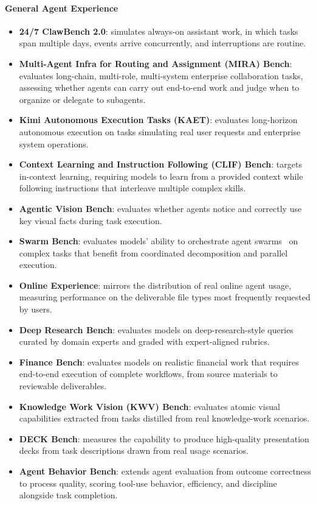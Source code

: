 \paragraph{General Agent Experience}
\begin{itemize}[leftmargin=12pt]
  \item \textbf{24/7 ClawBench 2.0}: simulates always-on assistant work, in which tasks span multiple days, events arrive concurrently, and interruptions are routine.
  \item \textbf{Multi-Agent Infra for Routing and Assignment (MIRA) Bench}: evaluates long-chain, multi-role, multi-system enterprise collaboration tasks, assessing whether agents can carry out end-to-end work and judge when to organize or delegate to subagents.
  \item \textbf{Kimi Autonomous Execution Tasks (KAET)}: evaluates long-horizon autonomous execution on tasks simulating real user requests and enterprise system operations.
  \item \textbf{Context Learning and Instruction Following (CLIF) Bench}: targets in-context learning, requiring models to learn from a provided context while following instructions that interleave multiple complex skills.
  \item \textbf{Agentic Vision Bench}: evaluates whether agents notice and correctly use key visual facts during task execution.
  \item \textbf{Swarm Bench}: evaluates models' ability to orchestrate agent swarms~\citep{kimik25} on complex tasks that benefit from coordinated decomposition and parallel execution.
  \item \textbf{Online Experience}: mirrors the distribution of real online agent usage, measuring performance on the deliverable file types most frequently requested by users.
  \item \textbf{Deep Research Bench}: evaluates models on deep-research-style queries curated by domain experts and graded with expert-aligned rubrics.
  \item \textbf{Finance Bench}:  evaluates models on realistic financial work that requires end-to-end execution of complete workflows, from source materials to reviewable deliverables.
  \item \textbf{Knowledge Work Vision (KWV) Bench}: evaluates atomic visual capabilities extracted from tasks distilled from real knowledge-work scenarios.
  \item \textbf{DECK Bench}: measures the capability to produce high-quality presentation decks from task descriptions drawn from real usage scenarios.
  \item \textbf{Agent Behavior Bench}: extends agent evaluation from outcome correctness to process quality, scoring tool-use behavior, efficiency, and discipline alongside task completion.
\end{itemize}

